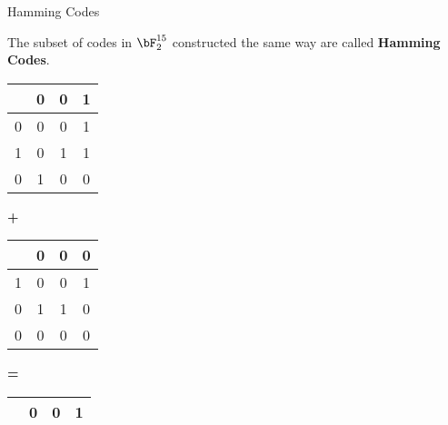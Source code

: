 \begin{frame}{Hamming Codes}
    
    The subset of codes in $\bF_2^{15}$ constructed the same way are called \textbf{Hamming Codes}.  \pause \\
    \vspace{0.5cm}
    \begin{minipage}{0.25\textwidth}
        \centering
        \begin{tabular}{|c|c|c|c|}
            \hline
            &  \cellcolor{red!20} 0 & \cellcolor{red!20} 0 & \cellcolor{blue!20}  1 \\ \hline
            \cellcolor{red!20} 0 & \cellcolor{blue!20} 0 & \cellcolor{blue!20}  0 & \cellcolor{blue!20} 1  \\ \hline
            \cellcolor{red!20} 1 & \cellcolor{blue!20} 0 &\cellcolor{blue!20}  1 &\cellcolor{blue!20} 1  \\ \hline
             \rowcolor{blue!20}0 & 1 & 0 & 0  \\ \hline
        \end{tabular}
    \end{minipage}
    \begin{minipage}{0.05\textwidth}
    \centering
        \textbf{+}
    \end{minipage}
    \begin{minipage}{0.25\textwidth}
    \centering
        \begin{tabular}{|c|c|c|c|}
            \hline
            &  \cellcolor{red!20} 0 & \cellcolor{red!20} 0 & \cellcolor{blue!20}  0 \\ \hline
            \cellcolor{red!20} 1 & \cellcolor{blue!20} 0 & \cellcolor{blue!20}  0 & \cellcolor{blue!20} 1  \\ \hline
            \cellcolor{red!20} 0 & \cellcolor{blue!20} 1 &\cellcolor{blue!20}  1 &\cellcolor{blue!20} 0  \\ \hline
             \rowcolor{blue!20}0 & 0 & 0 & 0  \\ \hline
        \end{tabular}
    \end{minipage}
    \begin{minipage}{0.05\textwidth}
    \centering
        \textbf{=}
    \end{minipage}
%
    \begin{minipage}{0.25\textwidth}
    \centering
        \begin{tabular}{|c|c|c|c|}
            \hline
            &  \cellcolor{red!20} 0 & \cellcolor{red!20} 0 & \cellcolor{blue!20}  1 \\ \hline

\end{tabular}
\end{minipage}
\end{frame}

